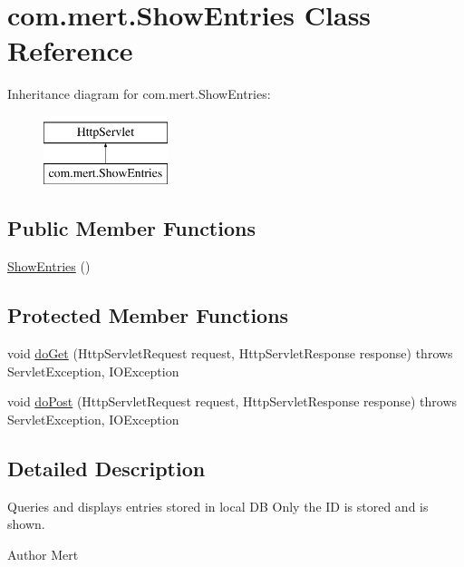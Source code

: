 \hypertarget{classcom_1_1mert_1_1_show_entries}{}\section{com.\+mert.\+Show\+Entries Class Reference}
\label{classcom_1_1mert_1_1_show_entries}
Inheritance diagram for com.\+mert.\+Show\+Entries\+:\begin{figure}[H]
\begin{center}
\leavevmode
\includegraphics[height=2.000000cm]{classcom_1_1mert_1_1_show_entries}
\end{center}
\end{figure}
\subsection*{Public Member Functions}
\begin{DoxyCompactItemize}
\item 
\hyperlink{classcom_1_1mert_1_1_show_entries_a8eb14533e722559f68c524926574c089}{Show\+Entries} ()
\end{DoxyCompactItemize}
\subsection*{Protected Member Functions}
\begin{DoxyCompactItemize}
\item 
void \hyperlink{classcom_1_1mert_1_1_show_entries_aac85a39ebe42db0bb8b85d1384e4f24f}{do\+Get} (Http\+Servlet\+Request request, Http\+Servlet\+Response response)  throws Servlet\+Exception, I\+O\+Exception 
\item 
void \hyperlink{classcom_1_1mert_1_1_show_entries_a84c2823b4ee4487c4f969932213d5587}{do\+Post} (Http\+Servlet\+Request request, Http\+Servlet\+Response response)  throws Servlet\+Exception, I\+O\+Exception 
\end{DoxyCompactItemize}


\subsection{Detailed Description}
Queries and displays entries stored in local DB Only the ID is stored and is shown. \begin{DoxyAuthor}{Author}
Mert 
\end{DoxyAuthor}


